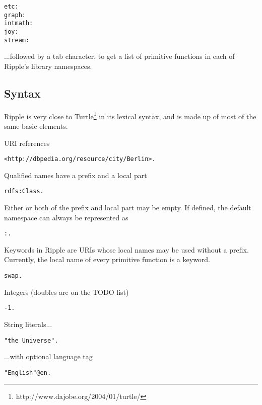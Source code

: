 \documentclass[runningheads]{llncs}
\begin{document}
\begin{verbatim}
etc:
graph:
intmath:
joy:
stream:
\end{verbatim}

...followed by a tab character, to get a list of primitive functions in each
of Ripple's library namespaces.


\subsection{Syntax}

Ripple is very close to Turtle\footnote{http://www.dajobe.org/2004/01/turtle/} in its lexical syntax, and is made up of most
of the same basic elements.
\newline

URI references

\begin{verbatim}
<http://dbpedia.org/resource/city/Berlin>.
\end{verbatim}

Qualified names have a prefix and a local part

\begin{verbatim}
rdfs:Class.
\end{verbatim}

Either or both of the prefix and local part may be empty.  If defined, the
default namespace can always be represented as

\begin{verbatim}
:.
\end{verbatim}

Keywords in Ripple are URIs whose local names may be used without a prefix.
Currently, the local name of every primitive function is a keyword.

\begin{verbatim}
swap.
\end{verbatim}

Integers (doubles are on the TODO list)

\begin{verbatim}
-1.
\end{verbatim}

String literals...

\begin{verbatim}
"the Universe".
\end{verbatim}

...with optional language tag

\begin{verbatim}
"English"@en.
\end{verbatim}
\end{document}
